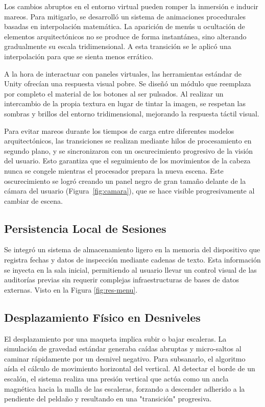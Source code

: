 Los cambios abruptos en el entorno virtual pueden romper la inmersión e inducir mareos. Para mitigarlo, se desarrolló un sistema de animaciones procedurales basadas en interpolación matemática. La aparición de menús u ocultación de elementos arquitectónicos no se produce de forma instantánea, sino alterando gradualmente su escala tridimensional. A esta transición se le aplicó una interpolación para que se sienta menos errático.

A la hora de interactuar con paneles virtuales, las herramientas estándar de Unity ofrecían una respuesta visual pobre. Se diseñó un módulo que reemplaza por completo el material de los botones al ser pulsados. Al realizar un intercambio de la propia textura en lugar de tintar la imagen, se respetan las sombras y brillos del entorno tridimensional, mejorando la respuesta táctil visual.

Para evitar mareos durante los tiempos de carga entre diferentes modelos arquitectónicos, las transiciones se realizan mediante hilos de procesamiento en segundo plano, y se sincronizaron con un oscurecimiento progresivo de la visión del usuario. Esto garantiza que el seguimiento de los movimientos de la cabeza nunca se congele mientras el procesador prepara la nueva escena. Este oscurecimiento se logró creando un panel negro de gran tamaño delante de la cámara del usuario (Figura~\ref{fig:camara}), que se hace visible progresivamente al cambiar de escena.

\subsection{Persistencia Local de Sesiones}
Se integró un sistema de almacenamiento ligero en la memoria del dispositivo que registra fechas y datos de inspección mediante cadenas de texto. Esta información se inyecta en la sala inicial, permitiendo al usuario llevar un control visual de las auditorías previas sin requerir complejas infraestructuras de bases de datos externas. Visto en la Figura \ref{fig:res-menu}.

\subsection{Desplazamiento Físico en Desniveles}
El desplazamiento por una maqueta implica subir o bajar escaleras. La simulación de gravedad estándar generaba caídas abruptas y micro-saltos al caminar rápidamente por un desnivel negativo. Para subsanarlo, el algoritmo aísla el cálculo de movimiento horizontal del vertical. Al detectar el borde de un escalón, el sistema realiza una presión vertical que actúa como un ancla magnética hacia la malla de las escaleras, forzando a descender adherido a la pendiente del peldaño y resultando en una "transición" progresiva.




